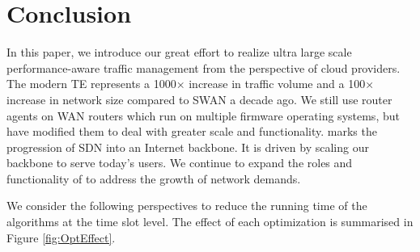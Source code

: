\section{Conclusion}
In this paper, we introduce our great effort to realize ultra large scale performance-aware traffic management from the perspective of cloud providers. The modern TE represents a 1000× increase in traffic volume and a 100× increase in network size compared to SWAN a decade ago. We still use router agents on WAN routers which run on multiple firmware operating systems, but have modified them to deal with greater scale and functionality. {\sys} marks the progression of SDN into an Internet backbone. It is driven by scaling our backbone to serve today’s users. We continue to expand the roles and functionality of {\sys} to address the growth of network demands.

We consider the following perspectives to reduce the running time of the algorithms at the time slot level. The effect of each optimization is summarised in Figure \ref{fig:OptEffect}. 


